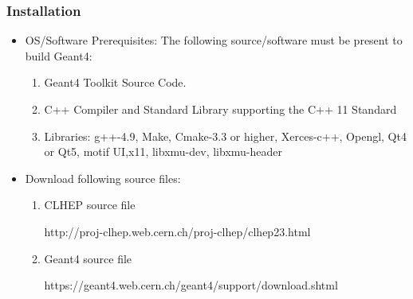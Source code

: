 \subsubsection{Installation}
\begin{itemize}
	\item  OS/Software Prerequisites:
		The following source/software must be present to build Geant4:
	\begin{enumerate}
		\item Geant4 Toolkit Source Code.
		\item C++ Compiler and Standard Library supporting the C++ 11 Standard
		\item Libraries: g++-4.9, Make, Cmake-3.3  or  higher, Xerces-c++, Opengl, Qt4  or  Qt5, motif UI,x11, libxmu-dev, libxmu-header
	\end{enumerate}
		
	\item Download following source files:
	\begin{enumerate}
		\item CLHEP source file
		
		http://proj-clhep.web.cern.ch/proj-clhep/clhep23.html
		\item Geant4 source file 
		
		https://geant4.web.cern.ch/geant4/support/download.shtml
	\end{enumerate}
		
\end{itemize}

